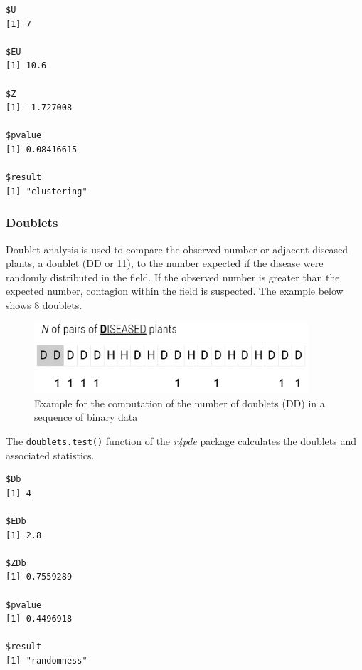 \documentclass[
  letterpaper,
]{book}
\newenvironment{Shaded}{\begin{snugshade}}{\end{snugshade}}
\newcommand{\FunctionTok}[1]{\textcolor[rgb]{0.28,0.35,0.67}{#1}}
\newcommand{\NormalTok}[1]{\textcolor[rgb]{0.00,0.23,0.31}{#1}}
\newcommand{\SpecialCharTok}[1]{\textcolor[rgb]{0.37,0.37,0.37}{#1}}
\begin{document}
\begin{verbatim}
$U
[1] 7

$EU
[1] 10.6

$Z
[1] -1.727008

$pvalue
[1] 0.08416615

$result
[1] "clustering"
\end{verbatim}

\hypertarget{doublets}{%
\subsubsection{Doublets}\label{doublets}}

Doublet analysis is used to compare the observed number or adjacent
diseased plants, a doublet (DD or 11), to the number expected if the
disease were randomly distributed in the field. If the observed number
is greater than the expected number, contagion within the field is
suspected. The example below shows 8 doublets.

\begin{figure}

{\centering \includegraphics[width=4.01042in,height=\textheight]{imgs/doublets.png}

}

\caption{\label{fig-doublet1}Example for the computation of the number
of doublets (DD) in a sequence of binary data}

\end{figure}

The \texttt{doublets.test()} function of the \emph{r4pde} package
calculates the doublets and associated statistics.

\begin{Shaded}
\end{Shaded}

\begin{verbatim}
$Db
[1] 4

$EDb
[1] 2.8

$ZDb
[1] 0.7559289

$pvalue
[1] 0.4496918

$result
[1] "randomness"
\end{verbatim}
\end{document}

